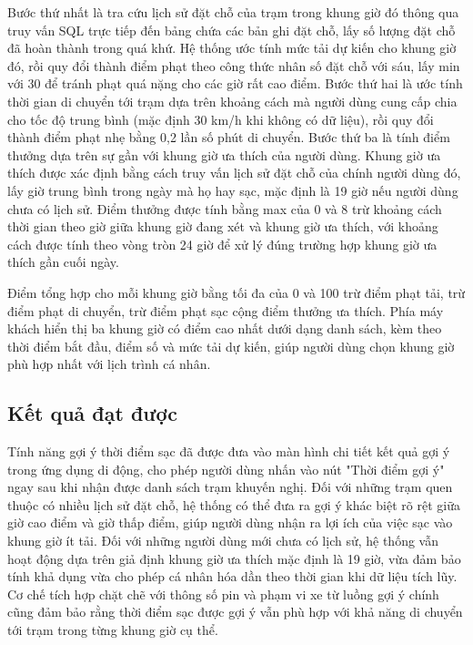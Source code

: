\documentclass[../Main.tex]{subfiles}
\begin{document}
Bước thứ nhất là tra cứu lịch sử đặt chỗ của trạm trong khung giờ đó thông qua truy vấn SQL trực tiếp đến bảng chứa các bản ghi đặt chỗ, lấy số lượng đặt chỗ đã hoàn thành trong quá khứ. Hệ thống ước tính mức tải dự kiến cho khung giờ đó, rồi quy đổi thành điểm phạt theo công thức nhân số đặt chỗ với sáu, lấy min với 30 để tránh phạt quá nặng cho các giờ rất cao điểm. Bước thứ hai là ước tính thời gian di chuyển tới trạm dựa trên khoảng cách mà người dùng cung cấp chia cho tốc độ trung bình (mặc định 30 km/h khi không có dữ liệu), rồi quy đổi thành điểm phạt nhẹ bằng 0,2 lần số phút di chuyển. Bước thứ ba là tính điểm thưởng dựa trên sự gần với khung giờ ưa thích của người dùng. Khung giờ ưa thích được xác định bằng cách truy vấn lịch sử đặt chỗ của chính người dùng đó, lấy giờ trung bình trong ngày mà họ hay sạc, mặc định là 19 giờ nếu người dùng chưa có lịch sử. Điểm thưởng được tính bằng max của 0 và 8 trừ khoảng cách thời gian theo giờ giữa khung giờ đang xét và khung giờ ưa thích, với khoảng cách được tính theo vòng tròn 24 giờ để xử lý đúng trường hợp khung giờ ưa thích gần cuối ngày.

Điểm tổng hợp cho mỗi khung giờ bằng tối đa của 0 và 100 trừ điểm phạt tải, trừ điểm phạt di chuyển, trừ điểm phạt sạc cộng điểm thưởng ưa thích. Phía máy khách hiển thị ba khung giờ có điểm cao nhất dưới dạng danh sách, kèm theo thời điểm bắt đầu, điểm số và mức tải dự kiến, giúp người dùng chọn khung giờ phù hợp nhất với lịch trình cá nhân.

\subsection{Kết quả đạt được}

Tính năng gợi ý thời điểm sạc đã được đưa vào màn hình chi tiết kết quả gợi ý trong ứng dụng di động, cho phép người dùng nhấn vào nút "Thời điểm gợi ý" ngay sau khi nhận được danh sách trạm khuyến nghị. Đối với những trạm quen thuộc có nhiều lịch sử đặt chỗ, hệ thống có thể đưa ra gợi ý khác biệt rõ rệt giữa giờ cao điểm và giờ thấp điểm, giúp người dùng nhận ra lợi ích của việc sạc vào khung giờ ít tải. Đối với những người dùng mới chưa có lịch sử, hệ thống vẫn hoạt động dựa trên giả định khung giờ ưa thích mặc định là 19 giờ, vừa đảm bảo tính khả dụng vừa cho phép cá nhân hóa dần theo thời gian khi dữ liệu tích lũy. Cơ chế tích hợp chặt chẽ với thông số pin và phạm vi xe từ luồng gợi ý chính cũng đảm bảo rằng thời điểm sạc được gợi ý vẫn phù hợp với khả năng di chuyển tới trạm trong từng khung giờ cụ thể.
\end{document}
